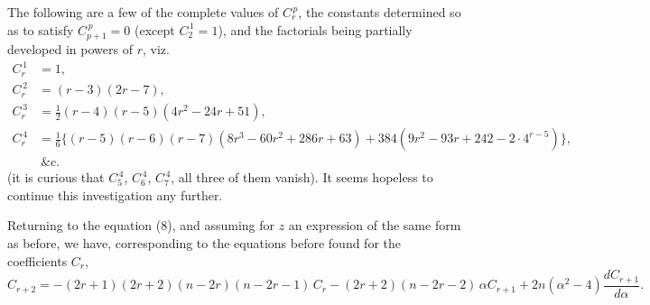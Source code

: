 \documentclass[12pt,a4paper]{article}
\theoremstyle{plain}
\begin{document}
The following are a few of the complete values of $C_r^{\,p}$, the constants determined so as to satisfy $C_{p+1}^{\,p} = 0$ (except $C_2^{\,1} = 1$), and the factorials being partially developed in powers of $r$, viz.
\begin{align*}
C_r^{\,1} &= 1, \\
C_r^{\,2} &= (r-3)(2r-7), \\
C_r^{\,3} &= \tfrac{1}{2}(r-4)(r-5)(4r^2 - 24r + 51), \\
C_r^{\,4} &= \tfrac{1}{6}\{(r-5)(r-6)(r-7)(8r^3 - 60r^2 + 286r + 63) + 384(9r^2 - 93r + 242 - 2 \cdot 4^{r-5})\}, \\
&\ \&\text{c.}
\end{align*}
(it is curious that $C_5^{\,4}$, $C_6^{\,4}$, $C_7^{\,4}$, all three of them vanish). It seems hopeless to continue this investigation any further.

Returning to the equation (8), and assuming for $z$ an expression of the same form as before, we have, corresponding to the equations before found for the coefficients $C_r$,
\[
C_{r+2} = -(2r+1)(2r+2)(n-2r)(n-2r-1)\,C_r - (2r+2)(n-2r-2)\,\alpha C_{r+1} + 2n(\alpha^2 - 4)\frac{dC_{r+1}}{d\alpha}.
\]
\end{document}
